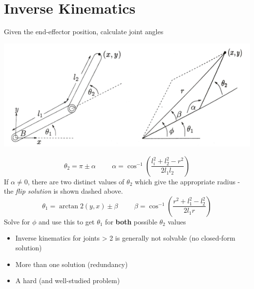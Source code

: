 \documentclass[10pt]{article}
\begin{document}
\section*{Inverse Kinematics}
Given the end-effector position, calculate joint angles
\begin{center} 
	\includegraphics*[width=\textwidth]{L1_19.png} 
\end{center}

\[\theta_2 = \pi \pm \alpha \hspace{1cm} \alpha = \cos^{-1} \left(\frac{l_i^2 + l_2^2 - r^2}{2l_1 l_2}\right)\]
If $\alpha \neq 0$, there are two distinct values of $\theta_2$ which give the appropriate radius - the \textit{flip solution} is shown dashed above.
\[\theta_1 = \arctan2(y, x) \pm \beta \hspace{1cm} \beta = \cos^{-1} \left(\frac{r^2 + l_1^2 - l_2^2}{2l_1 r}\right)\]
Solve for $\phi$ and use this to get $\theta_1$ for \textbf{both} possible $\theta_2$ values
\begin{itemize}
	\item Inverse kinematics for joints > 2 is generally not solvable (no closed-form solution)
	\item More than one solution (redundancy)
	\item A hard (and well-studied problem)
\end{itemize}
\end{document}
